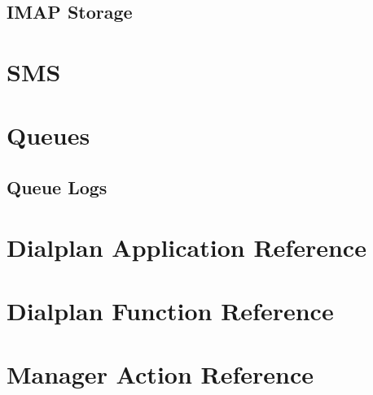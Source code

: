 \documentclass[12pt,a4]{report}
\begin{document}
  \section{IMAP Storage}
  

\chapter{SMS}


\chapter{Queues}
  
  \section{Queue Logs}
  

\chapter{Dialplan Application Reference}


\chapter{Dialplan Function Reference}


\chapter{Manager Action Reference}


%
%
%

\enddocument
\end{document}
